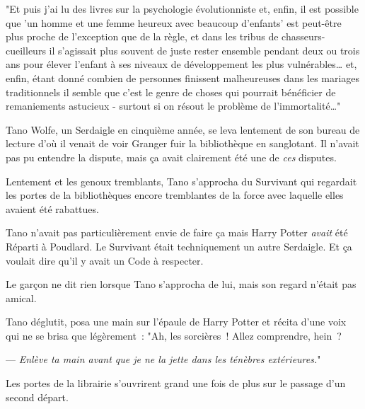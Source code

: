 "Et puis j'ai lu des livres sur la psychologie évolutionniste et, enfin, il est possible que 'un homme et une femme heureux avec beaucoup d'enfants' est peut-être plus proche de l'exception que de la règle, et dans les tribus de chasseurs-cueilleurs il s'agissait plus souvent de juste rester ensemble pendant deux ou trois ans pour élever l'enfant à ses niveaux de développement les plus vulnérables… et, enfin, étant donné combien de personnes finissent malheureuses dans les mariages traditionnels il semble que c'est le genre de choses qui pourrait bénéficier de remaniements astucieux - surtout si on résout le problème de l'immortalité…"

\later

Tano Wolfe, un Serdaigle en cinquième année, se leva lentement de son bureau de lecture d'où il venait de voir Granger fuir la bibliothèque en sanglotant. Il n'avait pas pu entendre la dispute, mais ça avait clairement été une de \emph{ces} disputes.

Lentement et les genoux tremblants, Tano s'approcha du Survivant qui regardait les portes de la bibliothèques encore tremblantes de la force avec laquelle elles avaient été rabattues.

Tano n'avait pas particulièrement envie de faire ça mais Harry Potter \emph{avait} été Réparti à Poudlard. Le Survivant était techniquement un autre Serdaigle. Et ça voulait dire qu'il y avait un Code à respecter.

Le garçon ne dit rien lorsque Tano s'approcha de lui, mais son regard n'était pas amical.

Tano déglutit, posa une main sur l'épaule de Harry Potter et récita d'une voix qui ne se brisa que légèrement~: "Ah, les sorcières~! Allez comprendre, hein~?

--- \emph{Enlève ta main avant que je ne la jette dans les ténèbres extérieures.}"

Les portes de la librairie s'ouvrirent grand une fois de plus sur le passage d'un second départ. 

